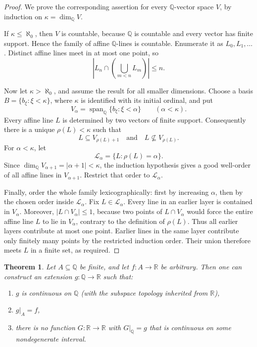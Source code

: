 \documentclass[11pt]{amsart} %
\newtheorem{theorem}{Theorem}[section]
\theoremstyle{definition}
\newcommand{\Q}{\mathbb{Q}}
\newcommand{\Span}{\operatorname{span}_{\Q}}
\begin{document}
\begin{proof}
We prove the corresponding assertion for every \(\Q\)-vector space \(V\), by induction on \(\kappa=\dim_{\Q}V\).

If \(\kappa\le\aleph_0\), then \(V\) is countable, because \(\Q\) is countable and every vector has finite support. Hence the family of affine \(\Q\)-lines is countable. Enumerate it as \(L_0,L_1,\ldots\). Distinct affine lines meet in at most one point, so
\begin{equation} 
 \left|L_n\cap (\bigcup_{m<n}L_m)\right|\le n.
\end{equation} 

Now let \(\kappa>\aleph_0\), and assume the result for all smaller dimensions. Choose a basis \(B=\{b_\xi:\xi<\kappa\}\), where \(\kappa\) is identified with its initial ordinal, and put
\begin{equation} 
 V_\alpha=\Span\{b_\xi:\xi<\alpha\}\qquad(\alpha<\kappa).
\end{equation} 
Every affine line \(L\) is determined by two vectors of finite support. Consequently there is a unique \(\rho(L)<\kappa\) such that
\begin{equation} 
 L\subseteq V_{\rho(L)+1}
 \quad\text{and}\quad
 L\nsubseteq V_{\rho(L)}.
\end{equation} 
For \(\alpha<\kappa\), let
\begin{equation} 
 \mathcal L_\alpha=\{L:\rho(L)=\alpha\}.
\end{equation} 
Since \(\dim_{\Q}V_{\alpha+1}=|\alpha+1|<\kappa\), the induction hypothesis gives a good well-order of all affine lines in \(V_{\alpha+1}\). Restrict that order to \(\mathcal L_\alpha\).

Finally, order the whole family lexicographically: first by increasing \(\alpha\), then by the chosen order inside \(\mathcal L_\alpha\). Fix \(L\in\mathcal L_\alpha\). Every line in an earlier layer is contained in \(V_\alpha\). Moreover, $|L\cap V_\alpha|\le1$, 
because two points of \(L\cap V_\alpha\) would force the entire affine line \(L\) to lie in \(V_\alpha\), contrary to the definition of \(\rho(L)\). Thus all earlier layers contribute at most one point. Earlier lines in the same layer contribute only finitely many points by the restricted induction order. Their union therefore meets \(L\) in a finite set, as required.
\end{proof}

\begin{theorem}
Let $A\subseteq\mathbb{Q}$ be finite, and let $f:A\rightarrow\mathbb{R}$ be arbitrary. Then one can
construct an extension $g:\mathbb{Q}\rightarrow\mathbb{R}$ such that:
\begin{enumerate}
\item[(1)] $g$ is continuous on $\mathbb{Q}$ (with the subspace topology inherited from $\mathbb{R}$),
\item[(2)] $g|_A = f$,
\item[(3)] there is no function $G:\mathbb{R}\rightarrow\mathbb{R}$ with $G|_{\mathbb{Q}}=g$ that is continuous on some
nondegenerate interval.
\end{enumerate}
\label{thm:cons2} 
\end{theorem}
\end{document}
